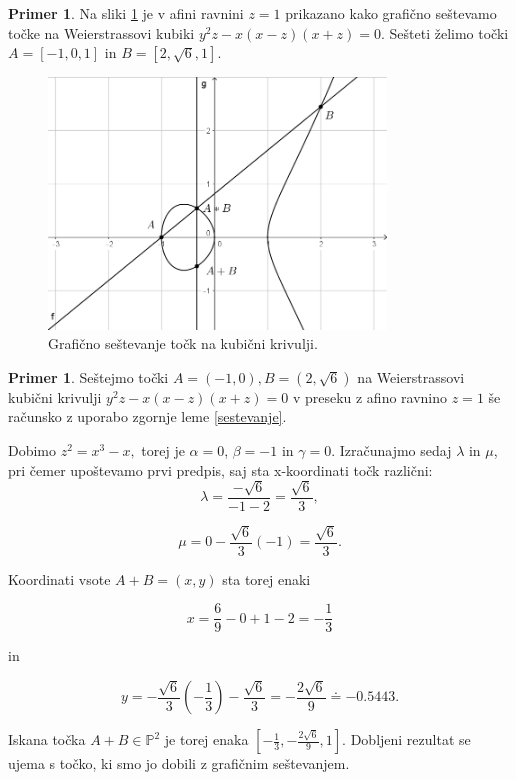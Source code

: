 \documentclass[12pt,a4paper,twoside]{article}
\theoremstyle{definition} %
\newtheorem{primer}[definicija]{Primer}
\theoremstyle{plain} %
\numberwithin{equation}{section}  %
\newcommand{\PP}{\mathbb P}
\begin{document}
\begin{primer}
Na sliki \ref{fig:adicija} je v afini ravnini $z=1$ prikazano kako grafično seštevamo točke na Weierstrassovi kubiki $y^2z-x(x-z)(x+z)=0$. Sešteti želimo točki $A =[-1,0,1]$ in $B=[2,\sqrt{6},1] $.
\\


\begin{figure}[h]
  \centering
  \includegraphics[width=0.8\textwidth]{images/adicija.png}
  \caption[Grafično seštevanje.]{Grafično seštevanje točk na kubični krivulji.}
  \label{fig:adicija}
\end{figure}

\end{primer}



\begin{primer}
Seštejmo točki $A =(-1,0),B=(2,\sqrt{6}) $ na Weierstrassovi kubični krivulji $y^2z-x(x-z)(x+z)=0$ v preseku z afino ravnino $z=1$ še računsko z uporabo zgornje leme \ref{sestevanje}.

Dobimo $z^2 = x^3-x,$
torej je $\alpha = 0$, $\beta = -1$ in $\gamma=0$. Izračunajmo sedaj $\lambda$ in $\mu$, pri čemer upoštevamo prvi predpis, saj sta x-koordinati točk različni:
$$\lambda = \frac{-\sqrt{6}}{-1-2} = \frac{\sqrt{6}}{3},$$

$$\mu = 0 - \frac{\sqrt{6}}{3} (-1) = \frac{\sqrt{6}}{3}.$$

Koordinati vsote $A+B=(x,y)$ sta torej enaki

$$x = \frac{6}{9} - 0+1-2=-\frac{1}{3}$$

in

$$y = -\frac{\sqrt{6}}{3}(-\frac{1}{3})-\frac{\sqrt{6}}{3}=-\frac{2\sqrt{6}}{9} \doteq -0.5443.$$

Iskana točka $A+B \in \PP^2$ je torej enaka $[-\frac{1}{3},-\frac{2\sqrt{6}}{9},1]$. Dobljeni rezultat se ujema s točko, ki smo jo dobili z grafičnim seštevanjem.

\end{primer}
\end{document}
